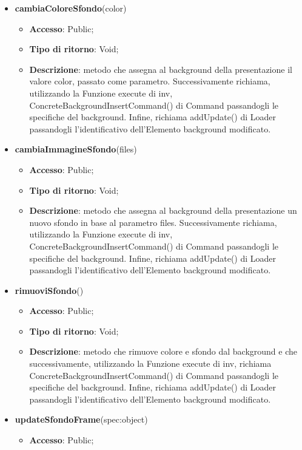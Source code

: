 {{\begin{itemize}
\begin{itemize}
			\end{itemize}
			\item \textbf{cambiaColoreSfondo}(color)
			\begin{itemize}
				\item \textbf{Accesso}: Public;
				\item \textbf{Tipo di ritorno}: Void;
				\item \textbf{Descrizione}: metodo che assegna al background della presentazione il valore color, passato come parametro. Successivamente richiama, utilizzando la Funzione execute di inv, ConcreteBackgroundInsertCommand() di Command passandogli le specifiche del background. Infine, richiama addUpdate() di Loader passandogli l'identificativo dell'Elemento background modificato.
			\end{itemize}
			\item \textbf{cambiaImmagineSfondo}(files)
			\begin{itemize}
				\item \textbf{Accesso}: Public;
				\item \textbf{Tipo di ritorno}: Void;
				\item \textbf{Descrizione}: metodo che assegna al background della presentazione un nuovo sfondo in base al parametro files. Successivamente richiama, utilizzando la Funzione execute di inv, ConcreteBackgroundInsertCommand() di Command passandogli le specifiche del background. Infine, richiama addUpdate() di Loader passandogli l'identificativo dell'Elemento background modificato.
			\end{itemize}
			\item \textbf{rimuoviSfondo}()
			\begin{itemize}
				\item \textbf{Accesso}: Public;
				\item \textbf{Tipo di ritorno}: Void;
				\item \textbf{Descrizione}: metodo che rimuove colore e sfondo dal background e che successivamente, utilizzando la Funzione execute di inv, richiama ConcreteBackgroundInsertCommand() di Command passandogli le specifiche del background. Infine, richiama addUpdate() di Loader passandogli l'identificativo dell'Elemento background modificato.
			\end{itemize}
			\item \textbf{updateSfondoFrame}(spec:object)
			\begin{itemize}
				\item \textbf{Accesso}: Public;

\end{itemize}
\end{itemize}}}
